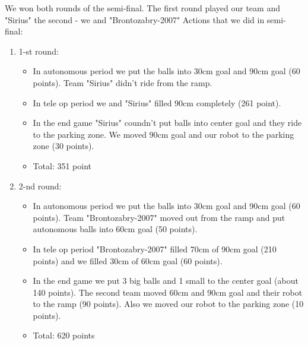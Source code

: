 We won both rounds of the semi-final. The first round played our team and "Sirius" the second - we and "Brontozabry-2007"\newline
Actions that we did in semi-final:
\begin{enumerate}
	\item 1-st round:
	\begin{itemize}
		\item In autonomous period we put the balls into 30cm goal and 90cm goal (60 points). Team "Sirius" didn't ride from the ramp.
		
		\item In tele op period we and "Sirius" filled 90cm completely (261 point).
		
		\item In the end game "Sirius" coundn't put balls into center goal and they ride to the parking zone. We moved 90cm goal and our robot to the parking zone (30 points).
		
		\item Total: 351 point 
	\end{itemize}
		\item 2-nd round:
		\begin{itemize}
			\item In autonomous period we put the balls into 30cm goal and 90cm goal (60 points). Team "Brontozabry-2007" moved out from the ramp and put autonomous balls into 60cm goal (50 points).
			
			\item In tele op period "Brontozabry-2007" filled 70cm of 90cm goal (210 points) and we filled 30cm of 60cm goal (60 points).
			
			\item In the end game we put 3 big balls and 1 small to the center goal (about 140 points). The second team moved 60cm and 90cm goal and their robot to the ramp (90 points). Also we moved our robot to the parking zone (10 points).
			
			\item Total: 620 points
		\end{itemize}
\end{enumerate}

